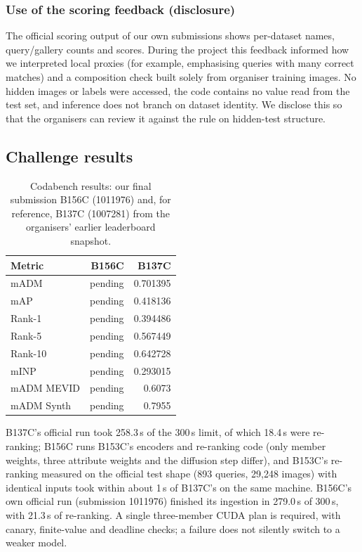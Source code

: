 \documentclass[a4paper, 10pt, conference]{ieeeconf}
\begin{document}
\subsubsection{Use of the scoring feedback (disclosure)}
The official scoring output of our own submissions shows per-dataset names, query/gallery counts and scores. During the project this feedback informed how we interpreted local proxies (for example, emphasising queries with many correct matches) and a composition check built solely from organiser training images. No hidden images or labels were accessed, the code contains no value read from the test set, and inference does not branch on dataset identity. We disclose this so that the organisers can review it against the rule on hidden-test structure.

\subsection{Challenge results}
\begin{table}[h]
\centering
\caption{Codabench results: our final submission B156C (1011976) and, for reference, B137C (1007281) from the organisers' earlier leaderboard snapshot.}
\begin{tabular}{lrr}\toprule
Metric & B156C & B137C\\\midrule
mADM & pending & 0.701395\\
mAP & pending & 0.418136\\
Rank-1 & pending & 0.394486\\
Rank-5 & pending & 0.567449\\
Rank-10 & pending & 0.642728\\
mINP & pending & 0.293015\\
mADM MEVID & pending & 0.6073\\
mADM Synth & pending & 0.7955\\\bottomrule
\end{tabular}
\end{table}
B137C's official run took 258.3\,s of the 300\,s limit, of which 18.4\,s were re-ranking; B156C runs B153C's encoders and re-ranking code (only member weights, three attribute weights and the diffusion step differ), and B153C's re-ranking measured on the official test shape (893 queries, 29{,}248 images) with identical inputs took within about 1\,s of B137C's on the same machine. B156C's own official run (submission 1011976) finished its ingestion in 279.0\,s of 300\,s, with 21.3\,s of re-ranking. A single three-member CUDA plan is required, with canary, finite-value and deadline checks; a failure does not silently switch to a weaker model.
\end{document}
